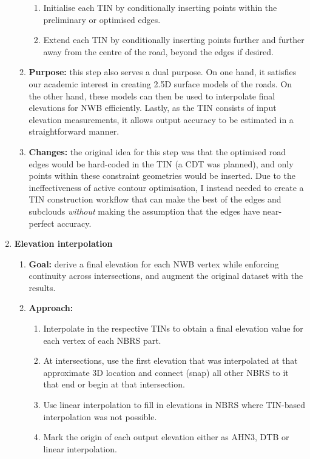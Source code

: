 \begin{enumerate}
\begin{enumerate}
\begin{enumerate}
            \item Initialise each TIN by conditionally inserting points within the preliminary or optimised edges.
            \item Extend each TIN by conditionally inserting points further and further away from the centre of the road, beyond the edges if desired. 
        \end{enumerate}
        \item \textbf{Purpose:} this step also serves a dual purpose. On one hand, it satisfies our academic interest in creating 2.5D surface models of the roads. On the other hand, these models can then be used to interpolate final elevations for NWB efficiently. Lastly, as the TIN consists of input elevation measurements, it allows output accuracy to be estimated in a straightforward manner.
        \item \textbf{Changes:} the original idea for this step was that the optimised road edges would be hard-coded in the TIN (a CDT was planned), and only points within these constraint geometries would be inserted. Due to the ineffectiveness of active contour optimisation, I instead needed to create a TIN construction workflow that can make the best of the edges and subclouds \textit{without} making the assumption that the edges have near-perfect accuracy.
    \end{enumerate}
    \item \textbf{Elevation interpolation}
    \begin{enumerate}
        \item \textbf{Goal:} derive a final elevation for each NWB vertex while enforcing continuity across intersections, and augment the original dataset with the results.
        \item \textbf{Approach:}
        \begin{enumerate}
            \item Interpolate in the respective TINs to obtain a final elevation value for each vertex of each NBRS part.
            \item At intersections, use the first elevation that was interpolated at that approximate 3D location and connect (snap) all other NBRS to it that end or begin at that intersection.
            \item Use linear interpolation to fill in elevations in NBRS where TIN-based interpolation was not possible.
            \item Mark the origin of each output elevation either as AHN3, DTB or linear interpolation.

\end{enumerate}
\end{enumerate}
\end{enumerate}
